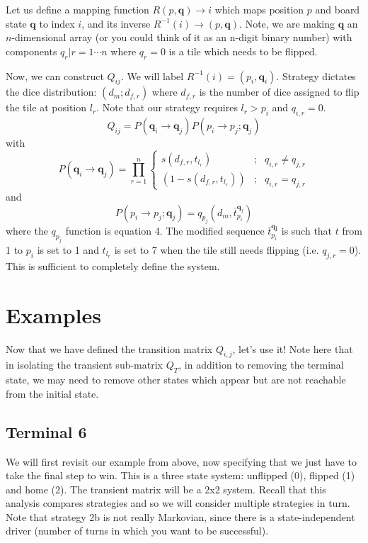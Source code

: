 \documentclass[letterpaper,11pt]{article}
\begin{document}
Let us define a mapping function
$R(p,\mathbf{q})\rightarrow i$ which maps position $p$ and board state 
$\mathbf{q}$ to index $i$, and its inverse 
$R^{-1}(i)\rightarrow(p,\mathbf{q})$.  Note, we are
making $\mathbf{q}$ an $n$-dimensional array (or you could think of it as an
n-digit binary number) with components $q_r|r=1\cdots n$ where $q_r=0$ is a
tile which needs to be flipped.  

Now, we can
construct $Q_{ij}$.  We will label $R^{-1}(i) = (p_i, \mathbf{q}_i)$.  Strategy
dictates the dice distribution: $(d_m;d_{f,r})$ where $d_{f,r}$ is the number
of dice assigned to flip the tile at position $l_r$.  Note that our strategy
requires $l_r>p_i$ and $q_{i,r}=0$.
\[
	Q_{ij} = P(\mathbf{q}_i\rightarrow\mathbf{q}_j)P(p_i \rightarrow p_j;\mathbf{q}_j)
\]
with
\[
	P(\mathbf{q}_i\rightarrow\mathbf{q}_j)=\prod_{r=1}^{n} 
	\left\{
		\begin{array}{lrl}
			s(d_{f,r},t_{l_r}) & ; & q_{i,r} \neq q_{j,r} \\
			\left(1-s(d_{f,r},t_{l_r})\right) &;& q_{i,r} = q_{j,r}
		\end{array}
	\right. 
\]
and
\[
	P(p_i \rightarrow p_j;\mathbf{q}_j)=q_{p_j}(d_m,\bar{t}_{p_i}^{\mathbf{q}_j})
\]
where the $q_{p_j}$ function is equation 4.  The modified sequence 
$\bar{t}_{p_i}^\mathbf{q_j}$ is such that $t$ from 1 to $p_i$ is set to 1 and
$t_{l_r}$ is set to 7 when the tile still needs flipping (i.e. $q_{j,r}=0$).
This is sufficient to completely define the system.

\section{Examples}
Now that we have defined the transition matrix $Q_{i,j}$, let's use it!  Note
here that in isolating the transient sub-matrix $Q_T$, in addition to removing
the terminal state, we may need to remove other states which appear but are
not reachable from the initial state.  

\subsection{Terminal 6}
We will first revisit our example from above, now specifying that we just
have to take the final step to win.  This is a three state system: unflipped
(0), flipped (1) and home (2).  The transient matrix will be a 2x2 system.
Recall that this analysis compares strategies and so we will consider multiple
strategies in turn.  Note that strategy 2b is not really Markovian, since
there is a state-independent driver (number of turns in which you want to be
successful). 
\end{document}
